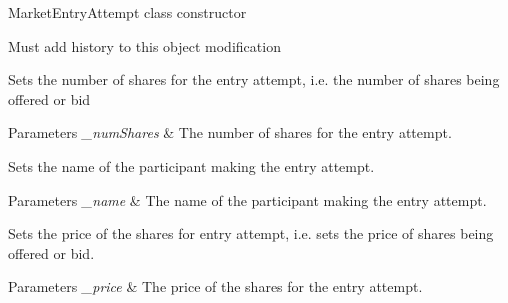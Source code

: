 
\begin{DoxyRefList}
\item[\label{todo__todo000001}%
\hypertarget{todo__todo000001}{}%
Member \hyperlink{classfinancialmarketsimulator_1_1market_1_1_market_entry_attempt_a385950bf02141fd83cdc5eeee9d82456}{financialmarketsimulator.market.Market\+Entry\+Attempt.Market\+Entry\+Attempt} (double price, int num\+Shares, String name, S\+I\+D\+E side)]Market\+Entry\+Attempt class constructor 
\item[\label{todo__todo000005}%
\hypertarget{todo__todo000005}{}%
Member \hyperlink{classfinancialmarketsimulator_1_1market_1_1_market_entry_attempt_a2a290b500e228a4757be491bb8027ca6}{financialmarketsimulator.market.Market\+Entry\+Attempt.replace\+With} (double price, int num\+Shares, String name, Date new\+Date, String stamp)]Must add history to this object modification  
\item[\label{todo__todo000003}%
\hypertarget{todo__todo000003}{}%
Member \hyperlink{classfinancialmarketsimulator_1_1market_1_1_market_entry_attempt_aa8258c5b268400356c03d190981f8843}{financialmarketsimulator.market.Market\+Entry\+Attempt.set\+Num\+Of\+Shares} (int \+\_\+num\+Shares)]Sets the number of shares for the entry attempt, i.\+e. the number of shares being offered or bid 
\begin{DoxyParams}{Parameters}
{\em \+\_\+num\+Shares} & The number of shares for the entry attempt.  \\
\hline
\end{DoxyParams}

\item[\label{todo__todo000004}%
\hypertarget{todo__todo000004}{}%
Member \hyperlink{classfinancialmarketsimulator_1_1market_1_1_market_entry_attempt_a33e6941423b64554d7d809d9748f49d2}{financialmarketsimulator.market.Market\+Entry\+Attempt.set\+Participant\+Name} (String \+\_\+name)]Sets the name of the participant making the entry attempt. 
\begin{DoxyParams}{Parameters}
{\em \+\_\+name} & The name of the participant making the entry attempt.  \\
\hline
\end{DoxyParams}

\item[\label{todo__todo000002}%
\hypertarget{todo__todo000002}{}%
Member \hyperlink{classfinancialmarketsimulator_1_1market_1_1_market_entry_attempt_ac699ee80481fd33069bc8749f1900f8f}{financialmarketsimulator.market.Market\+Entry\+Attempt.set\+Price} (double \+\_\+price)]Sets the price of the shares for entry attempt, i.\+e. sets the price of shares being offered or bid. 
\begin{DoxyParams}{Parameters}
{\em \+\_\+price} & The price of the shares for the entry attempt.  \\
\hline
\end{DoxyParams}


\end{DoxyRefList}

